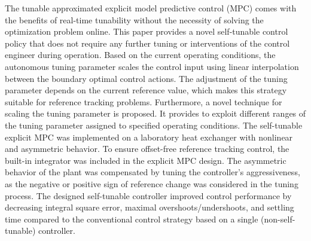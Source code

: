 \documentclass[preprint,12pt]{elsarticle}
\begin{document}
The tunable approximated explicit model predictive control (MPC) comes with the benefits of real-time tunability without the necessity of solving the optimization problem online. This paper provides a novel self-tunable control policy that does not require any further tuning or interventions of the control engineer during operation. Based on the current operating conditions, the autonomous tuning parameter scales the control input using linear interpolation between the boundary optimal control actions. The adjustment of the tuning parameter depends on the current reference value, which makes this strategy suitable for reference tracking problems. Furthermore, a novel technique for scaling the tuning parameter is proposed. It provides to exploit different ranges of the tuning parameter assigned to specified operating conditions. The self-tunable explicit MPC was implemented on a laboratory heat exchanger with nonlinear and asymmetric behavior. To ensure offset-free reference tracking control, the built-in integrator was included in the explicit MPC design. The asymmetric behavior of the plant was compensated by tuning the controller's aggressiveness, as the negative or positive sign of reference change was considered in the tuning process. The designed self-tunable controller improved control performance by decreasing integral square error, maximal overshoots/undershoots, and settling time compared to the conventional control strategy based on a single (non-self-tunable) controller. 
%
%
%
%
%
%
%
\end{document}
